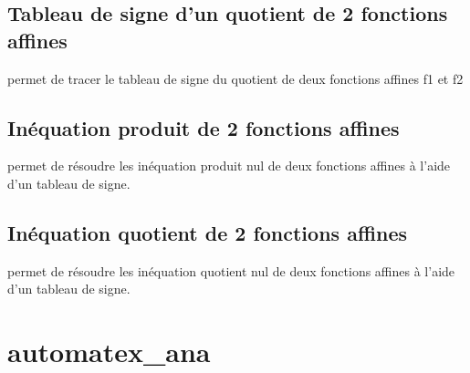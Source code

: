 \section{Tableau de signe d'un quotient de 2 fonctions affines}
 permet de tracer le tableau de signe du quotient de deux fonctions affines f1 et f2

\section{Inéquation produit de 2 fonctions affines}
 permet de résoudre les inéquation produit nul de deux fonctions affines à l'aide d'un tableau de signe.
\section{Inéquation quotient de 2 fonctions affines}
 permet de résoudre les inéquation quotient nul de deux fonctions affines à l'aide d'un tableau de signe.

\chapter{automatex\_ana}



